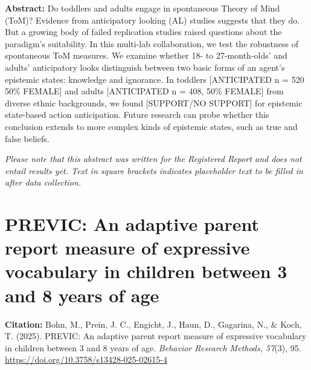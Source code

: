 \documentclass[
]{scrbook}
\begin{document}
\textbf{Abstract:} Do toddlers and adults engage in spontaneous Theory of Mind (ToM)? Evidence from anticipatory looking (AL) studies suggests that they do. But a growing body of failed replication studies raised questions about the paradigm's suitability. In this multi-lab collaboration, we test the robustness of spontaneous ToM measures. We examine whether 18- to 27-month-olds' and adults' anticipatory looks distinguish between two basic forms of an agent's epistemic states: knowledge and ignorance. In toddlers {[}ANTICIPATED n = 520 50\% FEMALE{]} and adults {[}ANTICIPATED n = 408, 50\% FEMALE{]} from diverse ethnic backgrounds, we found {[}SUPPORT/NO SUPPORT{]} for epistemic state-based action anticipation. Future research can probe whether this conclusion extends to more complex kinds of epistemic states, such as true and false beliefs.

\emph{Please note that this abstract was written for the Registered Report and does not entail results yet. Text in square brackets indicates placeholder text to be filled in after data collection.}

\newpage

\section*{PREVIC: An adaptive parent report measure of expressive vocabulary in children between 3 and 8 years of age}\label{previc}

\textbf{Citation:} Bohn, M., Prein, J. C., Engicht, J., Haun, D., Gagarina, N., \& Koch, T. (2025). PREVIC: An adaptive parent report measure of expressive vocabulary in children between 3 and 8 years of age. \emph{Behavior Research Methods, 57}(3), 95. \mbox{\url{https://doi.org/10.3758/s13428-025-02615-4}}
\end{document}
